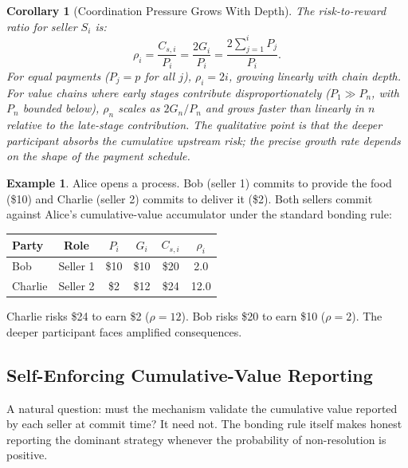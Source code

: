 \documentclass[11pt,a4paper]{article}
\newtheorem{corollary}[theorem]{Corollary}
\theoremstyle{definition}
\newtheorem{example}[theorem]{Example}
\theoremstyle{remark}
\newcommand{\pay}{P}           %
\newcommand{\cumval}{G}        %
\begin{document}
\begin{corollary}[Coordination Pressure Grows With Depth]
\label{cor:geometric-pressure}
The risk-to-reward ratio for seller $S_i$ is:
\begin{equation}
  \rho_i = \frac{C_{s,i}}{\pay_i} = \frac{2\cumval_i}{\pay_i}
    = \frac{2\sum_{j=1}^{i} \pay_j}{\pay_i}.
\end{equation}
For equal payments ($\pay_j = p$ for all $j$), $\rho_i = 2i$, growing
linearly with chain depth. For value chains where early stages
contribute disproportionately ($\pay_1 \gg \pay_n$, with $\pay_n$
bounded below), $\rho_n$ scales as $2 \cumval_n / \pay_n$ and grows
faster than linearly in $n$ relative to the late-stage contribution.
The qualitative point is that the deeper participant absorbs the
cumulative upstream risk; the precise growth rate depends on the
shape of the payment schedule.
\end{corollary}

\begin{example}
\label{ex:food-delivery}
Alice opens a process. Bob (seller 1) commits to provide the food
(\$10) and Charlie (seller 2) commits to deliver it (\$2). Both
sellers commit against Alice's cumulative-value accumulator under
the standard bonding rule:
\begin{center}
\begin{tabular}{lccccc}
\toprule
Party & Role & $\pay_i$ & $\cumval_i$ & $C_{s,i}$ & $\rho_i$ \\
\midrule
Bob     & Seller 1 & \$10 & \$10 & \$20 & 2.0 \\
Charlie & Seller 2 & \$2  & \$12 & \$24 & 12.0 \\
\bottomrule
\end{tabular}
\end{center}
Charlie risks \$24 to earn \$2 ($\rho = 12$). Bob risks \$20 to earn
\$10 ($\rho = 2$). The deeper participant faces amplified consequences.
\end{example}

\subsection{Self-Enforcing Cumulative-Value Reporting}
\label{sec:self-enforcing-reporting}

A natural question: must the mechanism validate the cumulative value
reported by each seller at commit time? It need not. The bonding
rule itself makes honest reporting the dominant strategy whenever
the probability of non-resolution is positive.
\end{document}

